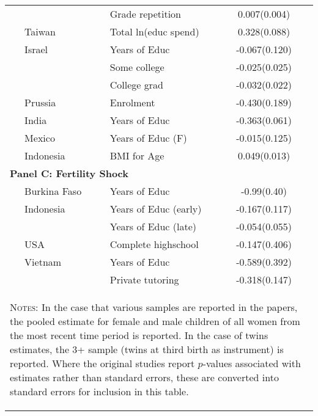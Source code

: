 \begin{table}[htpb!]
\begin{tabular}{lllc}
                                 &         &Grade repetition     &0.007(0.004)  \\
\citet{Lee2008}                  &Taiwan   &Total ln(educ spend) &0.328(0.088)  \\
\citet{Angristetal2010}          &Israel   &Years of Educ        &-0.067(0.120)\\
                                 &         &Some college         &-0.025(0.025)\\
                                 &         &College grad         &-0.032(0.022)\\
\citet{Beckeretal2010}           &Prussia  &Enrolment            &-0.430(0.189)\\
\citet{KumarKugler2011}          &India    &Years of Educ        &-0.363(0.061)\\
\citet{FitzsimonsMalde2014}      &Mexico   &Years of Educ (F)    &-0.015(0.125)\\ 
\citet{MillimetWang2011}         &Indonesia&BMI for Age          & 0.049(0.013)\\
\midrule
\multicolumn{4}{l}{\textbf{Panel C: Fertility Shock}} \\
\citet{Bougmaetal2015}           &Burkina Faso&Years of Educ        &-0.99(0.40)\\ 
\citet{Marlani2008}              &Indonesia   &Years of Educ (early)&-0.167(0.117)\\ 
                                 &            &Years of Educ (late) &-0.054(0.055)\\
\citet{Hotzetal1997}             &USA         &Complete highschool&-0.147(0.406)\\
\citet{DangRogers2013}           &Vietnam     &Years of Educ        &-0.589(0.392)\\
                                 &            &Private tutoring     &-0.318(0.147)\\
\bottomrule
\multicolumn{4}{p{12.9cm}}{\begin{footnotesize}\textsc{Notes:} In the case that 
various samples are reported in the papers, the pooled estimate for female and
male children of all women from the most recent time period is reported. In the 
case of twins estimates, the 3+ sample (twins at third birth as instrument) is
reported.  Where the original studies report $p$-values associated with estimates 
rather than standard errors, these are converted into standard errors for 
inclusion in this table.
\end{footnotesize}}
\end{tabular}     
\end{table}

